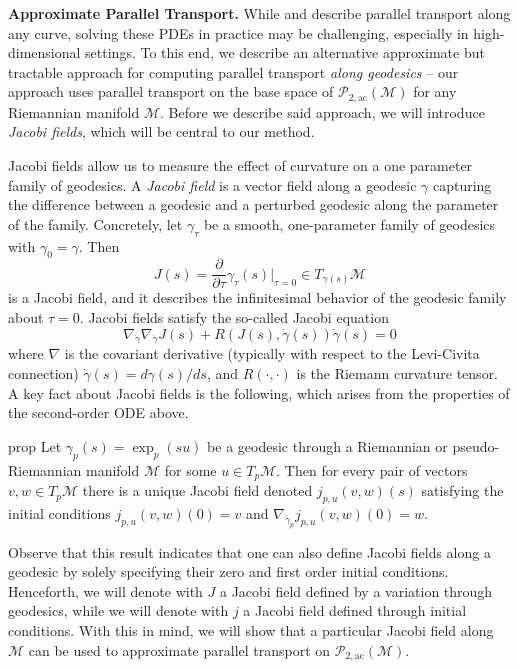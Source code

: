 \documentclass{article}
\newcommand{\man}{\mathcal{M}}
\begin{document}
\noindent \textbf{Approximate Parallel Transport.} While  and  describe parallel transport along any curve, solving these PDEs in practice may be challenging, especially in high-dimensional settings. To this end, we describe an alternative approximate but tractable approach for computing parallel transport \textit{along geodesics} -- our approach uses parallel transport on the base space of $\mathcal{P}_{2, \text{ac}}(\man)$ for any Riemannian manifold $\man$. Before we describe said approach, we will introduce \textit{Jacobi fields}, which will be central to our method.

Jacobi fields allow us to measure the effect of curvature on a one parameter family of geodesics. A \textit{Jacobi field} is a vector field along a geodesic $\gamma$ capturing the difference between a geodesic and a perturbed geodesic along the parameter of the family. Concretely, let $\gamma_{\tau}$ be a smooth, one-parameter family of geodesics with $\gamma_0 = \gamma$. Then
\begin{equation}
    J(s) = \frac{\partial}{\partial \tau}\gamma_{\tau}(s)\bigg|_{\tau = 0} \in T_{\gamma(s)}\man
\end{equation}
is a Jacobi field, and it describes the infinitesimal behavior of the geodesic family about $\tau = 0$. Jacobi fields satisfy the so-called Jacobi equation
\begin{equation}
    \nabla_{\dot\gamma}\nabla_{\dot\gamma}J(s) + R(J(s), \dot{\gamma}(s))\dot{\gamma}(s) = 0
\end{equation}
where $\nabla$ is the covariant derivative (typically with respect to the Levi-Civita connection) $\dot{\gamma}(s) = d\gamma(s)/ds$, and $R(\cdot, \cdot)$ is the Riemann curvature tensor. A key fact about Jacobi fields is the following, which arises from the properties of the second-order ODE above. 

\begin{restatable}{prop}{}
Let $\gamma_p(s) = \exp_p(su)$ be a geodesic through a Riemannian or pseudo-Riemannian manifold $\man$ for some $u \in T_p\man$. Then for every pair of vectors $v, w \in T_p\man$ there is a unique Jacobi field denoted $j_{p, u}(v, w )(s)$ satisfying the initial conditions $j_{p, u}(v, w )(0) = v$ and $\nabla_{\dot \gamma_p}j_{p, u}(v, w)(0) = w$. 
\end{restatable}

Observe that this result indicates that one can also define Jacobi fields along a geodesic by solely specifying their zero and first order initial conditions. Henceforth, we will denote with $J$ a Jacobi field defined by a variation through geodesics, while we will denote with $j$ a Jacobi field defined through initial conditions. With this in mind, we will show that a particular Jacobi field along $\man$ can be used to approximate parallel transport on $\mathcal{P}_{2, \text{ac}}(\man)$. 
\end{document}
